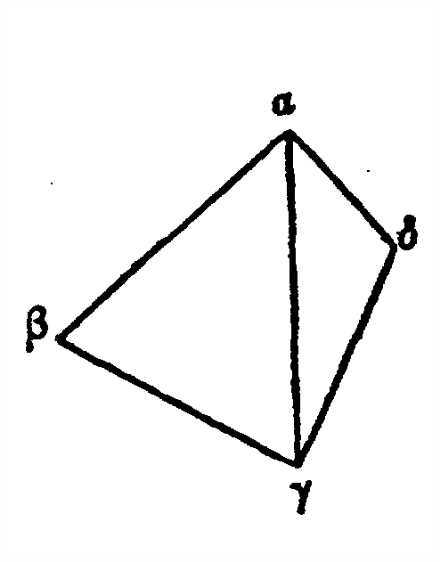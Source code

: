 \documentclass[12pt]{article}
\begin{document}
\begin{figure}
\begin{minipage}{.3\textwidth}
  \label{fig_12}
\end{minipage}
\begin{minipage}{.3\textwidth}
  \centering
  \includegraphics[width=\linewidth]{fig_13}
  \label{fig_13}
\end{minipage}
\end{figure}
\end{document}

